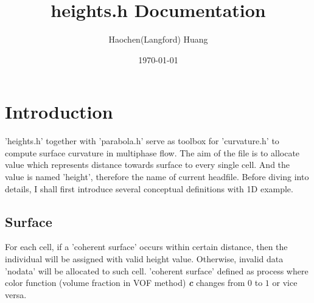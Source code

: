 \documentclass[a4paper]{article}
\title{heights.h Documentation}
\author{Haochen(Langford) Huang}
\date{\today}
\newcommand{\para}[1]{\textbf{\emph{\textcolor{para}{#1}}}}
\begin{document}
\maketitle

\section{Introduction}\label{sec:intro}
'heights.h' together with 'parabola.h' serve as toolbox for 'curvature.h' to compute surface curvature in multiphase flow. The aim of the file is to allocate value which represents distance towards surface to every single cell. And the value is named 'height', therefore the name of current headfile. Before diving into details, I shall first introduce several conceptual definitions with 1D example.
\subsection{Surface}
For each cell, if a 'coherent surface' occurs within certain distance, then the individual will be assigned with valid height value. Otherwise, invalid data 'nodata' will be allocated to such cell. 'coherent surface' defined as process where color function (volume fraction in VOF method) \para{c} changes from $0$ to $1$ or vice versa.
\end{document}
